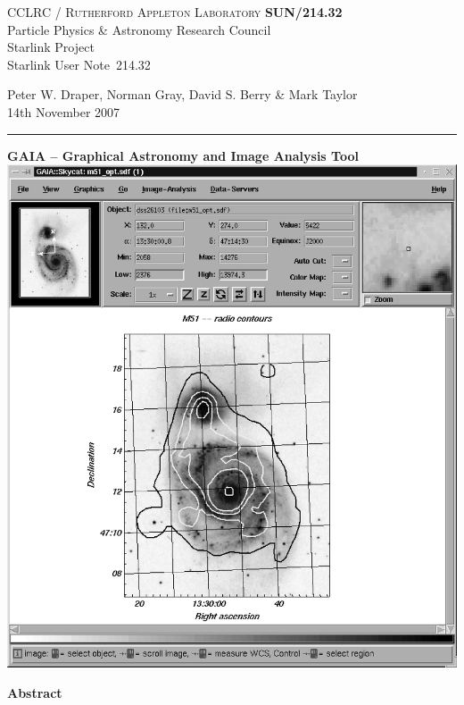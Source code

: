 \documentclass[twoside,11pt]{article}
\newcommand{\stardoccategory}  {Starlink User Note}
\newcommand{\stardocinitials}  {SUN}
\newcommand{\stardocnumber}    {214.32}
\newcommand{\stardocauthors}   {Peter W. Draper, 
                                Norman Gray, 
                                David S. Berry \& 
                                Mark Taylor }
\newcommand{\stardocdate}      {14th November 2007}
\newcommand{\stardoctitle}     {GAIA -- 
                                Graphical Astronomy and Image Analysis Tool}
\newcommand{\stardocname}{\stardocinitials /\stardocnumber}
\newenvironment{latexonly}{}{}
\renewcommand{\_}{\texttt{\symbol{95}}}
\begin{document}
\thispagestyle{empty}

\begin{latexonly}
   CCLRC / \textsc{Rutherford Appleton Laboratory} \hfill \textbf{\stardocname}\\
   {\large Particle Physics \& Astronomy Research Council}\\
   {\large Starlink Project\\}
   {\large \stardoccategory\ \stardocnumber}
   \begin{flushright}
   \stardocauthors\\
   \stardocdate
   \end{flushright}
   \vspace{-4mm}
   \rule{\textwidth}{0.5mm}
   \vspace{5mm}
   \begin{center}
   {\Large\textbf{\stardoctitle \\ [2.5ex]}}
   \vspace{5mm}
   \includegraphics[totalheight=5in]{sun214fig.ps}
   \end{center}

   \begin{center}
      {\Large\textbf{Abstract}}
   \end{center}
\end{latexonly}
\end{document}
